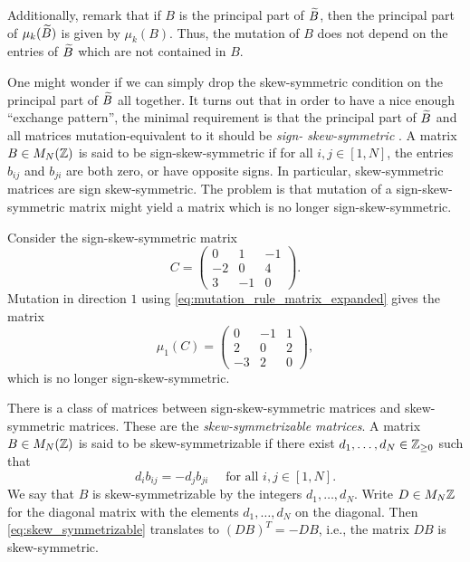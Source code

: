 Additionally, remark that if $B$ is the principal part of $\widetilde{B}$, then the principal
part of $\mu_k(\widetilde{B})$ is given by $\mu_k(B)$. Thus, the mutation of $B$ does not depend
on the entries of $\widetilde{B}$ which are not contained in $B$.

One might wonder if we can simply drop the skew-symmetric condition on the principal
part of $\widetilde{B}$ all together. It turns out that in order to have a nice enough ``exchange
pattern'', the minimal requirement is that the principal part of $\widetilde{B}$ and all matrices
mutation-equivalent to it should be \emph{sign-
	skew-symmetric}
\parencite[Proposition 4.3]{FominZelevinsky2002CAF}. A matrix $B \in M_N(\mathbb{Z})$ is said to
be sign-skew-symmetric if for all $i,j \in [1, N]$, the entries $b_{ij}$ and $b_{ji}$
are both zero, or have opposite signs. In particular, skew-symmetric matrices are sign
skew-symmetric. The problem is that mutation of a sign-skew-symmetric matrix might
yield a matrix which is no longer sign-skew-symmetric.

\begin{example}
	Consider the sign-skew-symmetric matrix
	\begin{equation*}
		C = \begin{pmatrix}
			0  & 1  & -1 \\
			-2 & 0  & 4  \\
			3  & -1 & 0
		\end{pmatrix}.
	\end{equation*}
	Mutation in direction $1$ using \cref{eq:mutation_rule_matrix_expanded} gives the
	matrix
	\begin{equation*}
		\mu_1(C) = \begin{pmatrix}
			0  & -1 & 1 \\
			2  & 0  & 2 \\
			-3 & 2  & 0
		\end{pmatrix},
	\end{equation*}
	which is no longer sign-skew-symmetric.
\end{example}

There is a class of matrices between sign-skew-symmetric matrices and skew-symmetric
matrices. These are the \emph{skew-symmetrizable
	matrices}. A matrix $B \in M_N(\mathbb{Z})$ is said to be
skew-symmetrizable if there exist $d_1, \dots, d_N \in \mathbb{Z}_{\geq 0}$ such that
\begin{equation}\label{eq:skew_symmetrizable}
	d_i b_{ij} = -d_j b_{ji}\quad  \text{ for all } i,j \in [1, N].
\end{equation}
%
We say that $B$ is skew-symmetrizable by the integers $d_1, \dots, d_N$. Write $D \in
	M_N{\mathbb{Z}}$ for the diagonal matrix with the elements $d_1, \dots, d_N$ on the diagonal.
Then \cref{eq:skew_symmetrizable} translates to $(DB)^T = -DB$, i.e., the matrix $DB$
is skew-symmetric.

